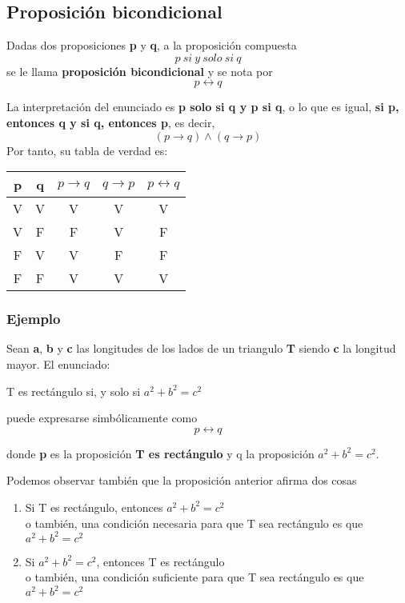 \documentclass[a4paper,11pt,oneside,titlepage,final]{scrartc}
\begin{document}
\subsection{Proposición bicondicional}

Dadas dos proposiciones \textbf{p} y \textbf{q}, a la proposición compuesta 
$$p~si~y~solo~si~q$$
se le llama \textbf{proposición bicondicional} y se nota por 
$$p \longleftrightarrow q$$

La interpretación del enunciado es \textbf{p solo si q y p si q}, o lo que es igual, \textbf{si p, entonces q y si q, entonces p}, es decir,
$$(p \longrightarrow q) \wedge (q \longrightarrow p)$$
Por tanto, su tabla de verdad es:\\

\begin{tabular}{|c|c|c|c|c|}
\hline 
p & q & $ p \longrightarrow q $ & $ q \longrightarrow p $ & $p \longleftrightarrow q$ \\ 
\hline 
V & V & V & V & V \\ 
\hline 
V & F & F & V & F \\ 
\hline 
F & V & V & F & F \\ 
\hline 
F & F & V & V & V \\ 
\hline 
\end{tabular} 

\subsubsection*{Ejemplo}

Sean \textbf{a}, \textbf{b} y \textbf{c} las longitudes de los lados de un triangulo \textbf{T} siendo \textbf{c} la longitud mayor. El enunciado:
\begin{center}
T es rectángulo si, y solo si $a^{2} + b^{2} = c^{2}$
\end{center}

puede expresarse simbólicamente como
$$ p \longleftrightarrow q $$

donde \textbf{p} es la proposición \textbf{T es rectángulo} y q la proposición $a^{2} + b^{2} = c^{2}$.\\

\begin{flushleft}
Podemos observar también que la proposición anterior afirma dos cosas
\end{flushleft}

\begin{enumerate}
\item Si T es rectángulo, entonces $a^{2} + b^{2} = c^{2}$\\
o también, una condición necesaria para que T sea rectángulo es que $a^{2} + b^{2} = c^{2}$
\item Si $a^{2} + b^{2} = c^{2}$, entonces T es rectángulo\\
o también, una condición suficiente para que T sea rectángulo es que $a^{2} + b^{2} = c^{2}$
\end{enumerate}
\end{document}
